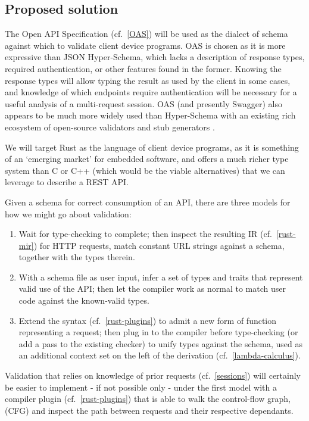 \subsection{Proposed solution}
The Open API Specification (cf.~\ref{OAS}) will be used as the dialect of schema against which to validate client device programs. OAS is chosen as it is more expressive than JSON Hyper-Schema, which lacks a description of response types, required authentication, or other features found in the former. Knowing the response types will allow typing the result as used by the client in some cases, and knowledge of which endpoints require authentication will be necessary for a useful analysis of a multi-request session. OAS (and presently Swagger) also appears to be much more widely used than Hyper-Schema \cite{anyone_use_hyperschema} with an existing rich ecosystem of open-source validators and stub generators \cite{swagger_oss}.\label{proposal-schema}

We will target Rust as the language of client device programs, as it is something of an `emerging market' for embedded software, and offers a much richer type system than C or C++ (which would be the viable alternatives) that we can leverage to describe a REST API.\label{proposal-lang}

Given a schema for correct consumption of an API, there are three models for how we might go about validation:
\begin{enumerate}
	\item Wait for type-checking to complete; then inspect the resulting IR (cf.~\ref{rust-mir}) for HTTP requests, match constant URL strings against a schema, together with the types therein.
	\item With a schema file as user input, infer a set of types and traits that represent valid use of the API; then let the compiler work as normal to match user code against the known-valid types.
	\item Extend the syntax (cf.~\ref{rust-plugins}) to admit a new form of function representing a request; then plug in to the compiler before type-checking (or add a pass to the existing checker) to unify types against the schema, used as an additional context set on the left of the derivation (cf.~\ref{lambda-calculus}).
\end{enumerate}\label{discussion-models-validation}

Validation that relies on knowledge of prior requests (cf.~\ref{sessions}) will certainly be easier to implement - if not possible only - under the first model with a compiler plugin (cf.~\ref{rust-plugins}) that is able to walk the control-flow graph, (CFG) and inspect the path between requests and their respective dependants.

